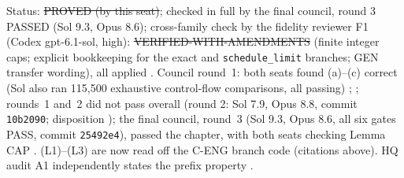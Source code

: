 \begin{reviewflag}
Status: \st{PROVED (by this seat)}; checked in full by the final council, round 3 PASSED (Sol 9.3, Opus 8.6); cross-family check by the fidelity reviewer F1 (Codex gpt-6.1-sol, high): \st{VERIFIED-WITH-AMENDMENTS} (finite integer caps; explicit bookkeeping for the exact and \texttt{schedule\_limit} branches; GEN transfer wording), all applied . Council round~1: both seats found (a)--(c) correct (Sol also ran 115,500 exhaustive control-flow comparisons, all passing) ; ; rounds~1 and~2 did not pass overall (round 2: Sol 7.9, Opus 8.8, commit \texttt{10b2090}; disposition ); the final council, round~3 (Sol 9.3, Opus 8.6, all six gates PASS, commit \texttt{25492e4}), passed the chapter, with both seats checking Lemma CAP . (L1)--(L3) are now read off the C-ENG branch code (citations above). HQ audit A1 independently states the prefix property .
\end{reviewflag}

